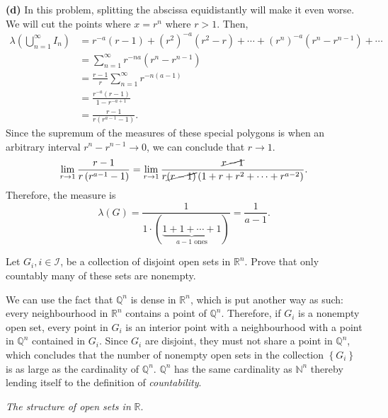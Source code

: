 \documentclass[answers]{exam}
\begin{document}
\begin{questions}
   \begin{solution}
      \textbf{(d)} In this problem, splitting the abscissa equidistantly will make it even worse. We will cut the points where $x=r^{n}$ where $r>1$. Then, 
      \begin{align*}
         \lambda\left(\bigcup_{n=1}^{\infty}I_{n}\right) &= r^{-a}\left(r-1\right) + \left(r^{2}\right)^{-a}\left(r^{2}-r\right) + \cdots +\left(r^{n}\right)^{-a}\left(r^{n}-r^{n-1}\right)+\cdots \\
         &= \sum_{n=1}^{\infty}r^{-na}\left(r^{n}-r^{n-1}\right)\\
         &= \frac{r-1}{r}\sum_{n=1}^{\infty}r^{-n\left(a-1\right)}\\
         &= \frac{r^{-a}\left(r-1\right)}{1-r^{-a+1}}\\
         &= \frac{r-1}{r\left(r^{a-1}-1\right)}.
      \end{align*}
      Since the supremum of the measures of these special polygons is when an arbitrary interval $r^{n}-r^{n-1} \to 0$, we can conclude that $r \to 1$.
      $$
         \lim\limits_{r\to 1} \frac{r-1}{r\left(r^{a-1}-1\right)} = \lim\limits_{r\to 1} \frac{\cancel{r-1}}{r\cancel{\left(r-1\right)}\left(1+r+r^{2}+\cdots + r^{a-2}\right)}.
      $$
      Therefore, the measure is
      $$
         \lambda\left(G\right) = \frac{1}{1 \cdot \left(\underbrace{1 + 1+ \cdots + 1}_{a-1 \text{ ones}}\right)} = \frac{1}{a-1}.
      $$
   \end{solution}
   \question
   Let $G_{i}, i \in \mathcal{I}$, be a collection of disjoint open sets in $\mathbb{R}^{n}$. Prove that only countably many of these sets are nonempty.
   \begin{solution}
      We can use the fact that $\mathbb{Q}^{n}$ is dense in $\mathbb{R}^{n}$, which is put another way as such: every neighbourhood in $\mathbb{R}^{n}$ contains a point of $\mathbb{Q}^{n}$. Therefore, if $G_{i}$ is a nonempty open set, every point in $G_{i}$ is an interior point with a neighbourhood with a point in $\mathbb{Q}^{n}$ contained in $G_{i}$. Since $G_{i}$ are disjoint, they must not share a point in $\mathbb{Q}^{n}$, which concludes that the number of nonempty open sets in the collection $\left\{G_{i}\right\}$ is as large as the cardinality of $\mathbb{Q}^{n}$. $\mathbb{Q}^{n}$ has the same cardinality as $\mathbb{N}^{n}$ thereby lending itself to the definition of \emph{countability}. 
   \end{solution}
   \question
   \emph{The structure of open sets in} $\mathbb{R}$.\\

\end{questions}
\end{document}

